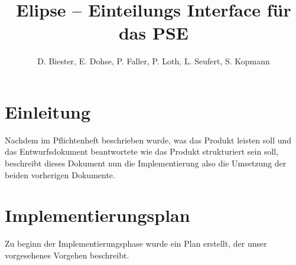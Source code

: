 \documentclass[parskip=full]{scrartcl}
\begin{document}
\title{Elipse -- Einteilungs Interface für das PSE}
\author{D. Biester, E. Dohse, P. Faller, P. Loth, L. Seufert, S. Kopmann}
\zweitgutachter{}
\mytitlepage
{\setlength{\textheight}{297mm}
\tableofcontents

\setlength{\textheight}{297mm}}
\pagebreak

\section{Einleitung}

Nachdem im Pflichtenheft beschrieben wurde, was das Produkt leisten soll und
das Entwurfsdokument beantwortete  wie das Produkt strukturiert sein soll, 
beschreibt dieses Dokument nun die Implementierung also die Umsetzung der beiden vorherigen Dokumente.

\section{Implementierungsplan}
Zu beginn der Implementierungsphase wurde ein Plan erstellt, der unser
vorgesehenes Vorgehen beschreibt.
%
\end{document}
